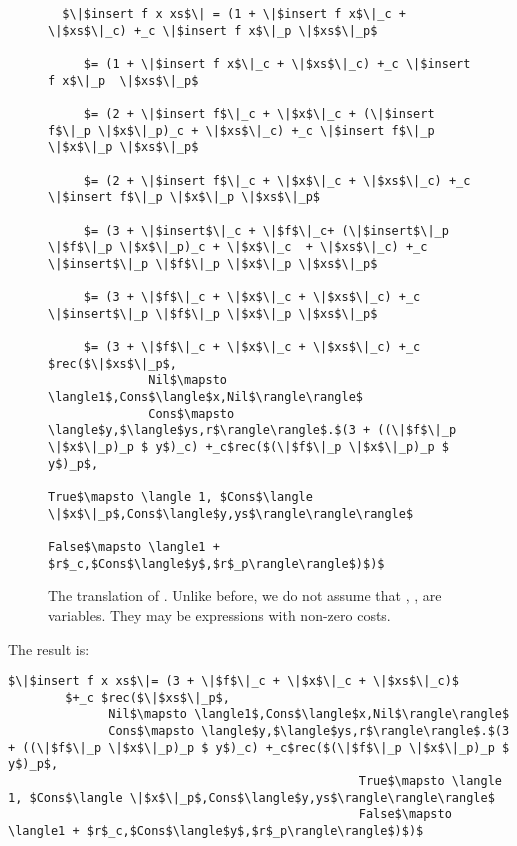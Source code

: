 \begin{figure}[H]
  \caption{The translation of .
  Unlike before, we do not assume that , ,  are variables.
  They may be expressions with non-zero costs.}
  \label{fig:insert_applied}
  \begin{lstlisting}
  $\|$insert f x xs$\| = (1 + \|$insert f x$\|_c + \|$xs$\|_c) +_c \|$insert f x$\|_p \|$xs$\|_p$

     $= (1 + \|$insert f x$\|_c + \|$xs$\|_c) +_c \|$insert f x$\|_p  \|$xs$\|_p$

     $= (2 + \|$insert f$\|_c + \|$x$\|_c + (\|$insert f$\|_p \|$x$\|_p)_c + \|$xs$\|_c) +_c \|$insert f$\|_p \|$x$\|_p \|$xs$\|_p$

     $= (2 + \|$insert f$\|_c + \|$x$\|_c + \|$xs$\|_c) +_c \|$insert f$\|_p \|$x$\|_p \|$xs$\|_p$

     $= (3 + \|$insert$\|_c + \|$f$\|_c+ (\|$insert$\|_p \|$f$\|_p \|$x$\|_p)_c + \|$x$\|_c  + \|$xs$\|_c) +_c \|$insert$\|_p \|$f$\|_p \|$x$\|_p \|$xs$\|_p$

     $= (3 + \|$f$\|_c + \|$x$\|_c + \|$xs$\|_c) +_c \|$insert$\|_p \|$f$\|_p \|$x$\|_p \|$xs$\|_p$

     $= (3 + \|$f$\|_c + \|$x$\|_c + \|$xs$\|_c) +_c $rec($\|$xs$\|_p$,
              Nil$\mapsto \langle1$,Cons$\langle$x,Nil$\rangle\rangle$
              Cons$\mapsto \langle$y,$\langle$ys,r$\rangle\rangle$.$(3 + ((\|$f$\|_p \|$x$\|_p)_p $ y$)_c) +_c$rec($(\|$f$\|_p \|$x$\|_p)_p $ y$)_p$,
                                                 True$\mapsto \langle 1, $Cons$\langle \|$x$\|_p$,Cons$\langle$y,ys$\rangle\rangle\rangle$
                                                 False$\mapsto \langle1 + $r$_c,$Cons$\langle$y$,$r$_p\rangle\rangle$)$)$
  \end{lstlisting}
\end{figure}


The result is:
\begin{lstlisting}
$\|$insert f x xs$\|= (3 + \|$f$\|_c + \|$x$\|_c + \|$xs$\|_c)$
        $+_c $rec($\|$xs$\|_p$,
              Nil$\mapsto \langle1$,Cons$\langle$x,Nil$\rangle\rangle$
              Cons$\mapsto \langle$y,$\langle$ys,r$\rangle\rangle$.$(3 + ((\|$f$\|_p \|$x$\|_p)_p $ y$)_c) +_c$rec($(\|$f$\|_p \|$x$\|_p)_p $ y$)_p$,
                                                 True$\mapsto \langle 1, $Cons$\langle \|$x$\|_p$,Cons$\langle$y,ys$\rangle\rangle\rangle$
                                                 False$\mapsto \langle1 + $r$_c,$Cons$\langle$y$,$r$_p\rangle\rangle$)$)$
\end{lstlisting}



